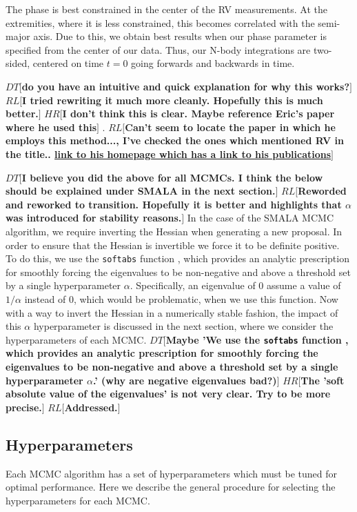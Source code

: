 \documentclass{aa}
\def\memohr#1{\color{blue}$HR[${\bf #1}$]$ \color{black}}
\def\memodt#1{\color{green}$DT[${\bf #1}$]$ \color{black}}
\def\memorl#1{\color{gray}$RL[${\bf #1}$]$ \color{black}}
\begin{document}
The phase is best constrained in the center of the RV measurements. 
At the extremities, where it is less constrained, this becomes correlated with the semi-major axis. 
Due to this, we obtain best results when our phase parameter is specified from the center of our data. 
Thus, our N-body integrations are two-sided, centered on time $t=0$ going forwards and backwards in time.

\memodt{do you have an intuitive and quick explanation for why this works?}
\memorl{I tried rewriting it much more cleanly. Hopefully this is much better.}
 \memohr{I don't think this is clear. Maybe reference Eric's paper where he used this}.
\memorl{Can't seem to locate the paper in which he employs this method..., I've checked the ones which mentioned RV in the title.. \href{http://astro.psu.edu/people/ebf11}{link to his homepage which has a link to his publications}}

\memodt{I believe you did the above for all MCMCs. I think the below should be explained under SMALA in the next section.} 
\memorl{Reworded and reworked to transition. Hopefully it is better and highlights that $\alpha$ was introduced for stability reasons.}
In the case of the SMALA MCMC algorithm, we require inverting the Hessian when generating a new proposal. 
In order to ensure that the Hessian is invertible we force it to be definite positive.
To do this, we use the \texttt{softabs} function \citep{softabs}, which provides an analytic prescription for smoothly forcing the eigenvalues to be non-negative and above a threshold set by a single hyperparameter $\alpha$.
Specifically, an eigenvalue of $0$ assume a value of $1/\alpha$ instead of $0$, which would be problematic, when we use this function.
Now with a way to invert the Hessian in a numerically stable fashion, the impact of this $\alpha$ hyperparameter is discussed in the next section, where we consider the hyperparameters of each MCMC.
\memodt{Maybe 'We use the \texttt{softabs} function \citep{softabs}, which provides an analytic prescription for smoothly forcing the eigenvalues to be non-negative and above a threshold set by a single hyperparameter $\alpha$.' (why are negative eigenvalues bad?)}
\memohr{The 'soft absolute value of the eigenvalues' is not very clear. Try to be more precise.} 
\memorl{Addressed.}

\subsection{Hyperparameters}\label{hyper}
Each MCMC algorithm has a set of hyperparameters which must be tuned for optimal performance. Here we describe the general procedure for selecting the hyperparameters for each MCMC.
\end{document}
